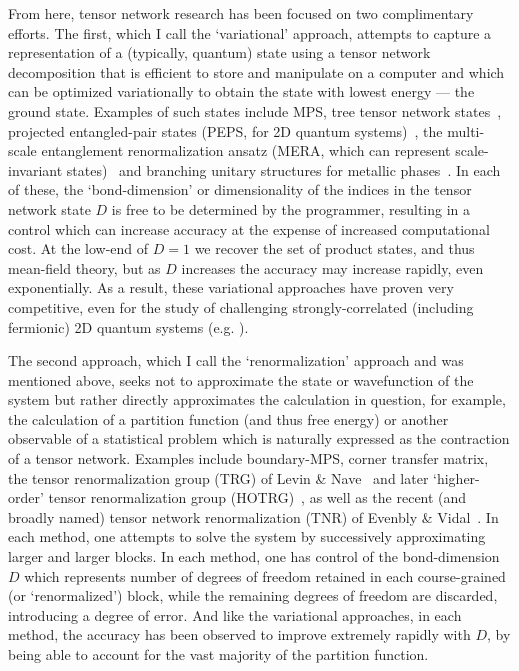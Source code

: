 \documentclass[aps,prl,nopacs,twocolumn]{revtex4}
\begin{document}
From here, tensor network research has been focused on two complimentary efforts. The first, which I call the `variational' approach, attempts to capture a representation of a (typically, quantum) state using a tensor network decomposition that is efficient to store and manipulate on a computer and which can be optimized variationally to obtain the state with lowest energy --- the ground state. Examples of such states include MPS, tree tensor network states~\cite{Shi2006,Tagliacozzo2009}, projected entangled-pair states (PEPS, for 2D quantum systems)~\cite{Verstraete2004,Jordan2008,Gu2008}, the multi-scale entanglement renormalization ansatz (MERA, which can represent scale-invariant states)~\cite{Vidal2007b,Vidal2008} and branching unitary structures for metallic phases~\cite{Evenbly2014b,Ferris2014}. In each of these, the `bond-dimension' or dimensionality of the indices in the tensor network state $D$ is free to be determined by the programmer, resulting in a control which can increase accuracy at the expense of increased computational cost. At the low-end of $D=1$ we recover the set of product states, and thus mean-field theory, but as $D$ increases the accuracy may increase rapidly, even exponentially. As a result, these variational approaches have proven very competitive, even for the study of challenging strongly-correlated (including fermionic) 2D quantum systems (e.g. \cite{Yan2010,Corboz2014,Corboz2014b}).

The second approach, which I call the `renormalization' approach and was mentioned above, seeks not to approximate the state or wavefunction of the system but rather directly approximates the calculation in question, for example, the calculation of a partition function (and thus free energy) or another observable of a statistical problem which is naturally expressed as the contraction of a tensor network. Examples include boundary-MPS, corner transfer matrix, the tensor renormalization group (TRG) of Levin \& Nave~\cite{Levin2006} and later `higher-order' tensor renormalization group (HOTRG)~\cite{Xie2012}, as well as the recent (and broadly named) tensor network renormalization (TNR) of Evenbly \& Vidal~\cite{Evenbly2014}. In each method, one attempts to solve the system by successively approximating larger and larger blocks. In each method, one has control of the bond-dimension $D$ which represents number of degrees of freedom retained in each course-grained (or `renormalized') block, while the remaining degrees of freedom are discarded, introducing a degree of error. And like the variational approaches, in each method, the accuracy has been observed to improve extremely rapidly with $D$, by being able to account for the vast majority of the partition function.
\end{document}
